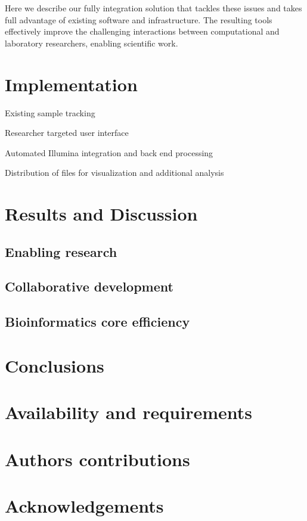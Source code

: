 \documentclass[10pt]{bmc_article}
\newenvironment{bmcformat}{\begin{raggedright}\baselineskip20pt\sloppy\setboolean{publ}{false}}{\end{raggedright}\baselineskip20pt\sloppy}
\begin{document}
\begin{bmcformat}
Here we describe our fully integration solution that tackles these
issues and takes full advantage of existing software and
infrastructure. The resulting tools effectively improve the
challenging interactions between computational and laboratory
researchers, enabling scientific work.

\section*{Implementation}

Existing sample tracking

Researcher targeted user interface

Automated Illumina integration and back end processing

Distribution of files for visualization and additional analysis

\section*{Results and Discussion}

\subsection*{Enabling research}

\subsection*{Collaborative development}

\subsection*{Bioinformatics core efficiency}

\section*{Conclusions}

\section*{Availability and requirements}

\section*{Authors contributions}

\section*{Acknowledgements}


\end{bmcformat}
\end{document}
